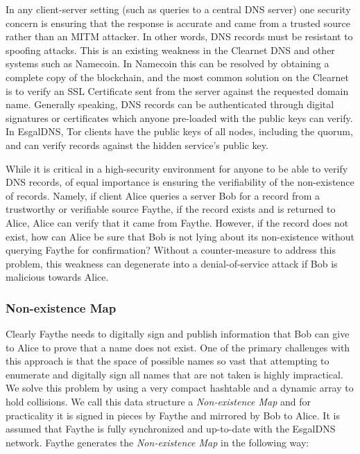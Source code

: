 In any client-server setting (such as queries to a central DNS server) one security concern is ensuring that the response is accurate and came from a trusted source rather than an MITM attacker. In other words, DNS records must be resistant to spoofing attacks. This is an existing weakness in the Clearnet DNS and other systems such as Namecoin. In Namecoin this can be resolved by obtaining a complete copy of the blockchain, and the most common solution on the Clearnet is to verify an SSL Certificate sent from the server against the requested domain name. Generally speaking, DNS records can be authenticated through digital signatures or certificates which anyone pre-loaded with the public keys can verify. In EsgalDNS, Tor clients have the public keys of all nodes, including the quorum, and can verify records against the hidden service's public key.

While it is critical in a high-security environment for anyone to be able to verify DNS records, of equal importance is ensuring the verifiability of the non-existence of records. Namely, if client Alice queries a server Bob for a record from a trustworthy or verifiable source Faythe, if the record exists and is returned to Alice, Alice can verify that it came from Faythe. However, if the record does not exist, how can Alice be sure that Bob is not lying about its non-existence without querying Faythe for confirmation? Without a counter-measure to address this problem, this weakness can degenerate into a denial-of-service attack if Bob is malicious towards Alice.

\subsubsection{Non-existence Map}

Clearly Faythe needs to digitally sign and publish information that Bob can give to Alice to prove that a name does not exist. One of the primary challenges with this approach is that the space of possible names so vast that attempting to enumerate and digitally sign all names that are not taken is highly impractical. We solve this problem by using a very compact hashtable and a dynamic array to hold collisions. We call this data structure a \emph{Non-existence Map} and for practicality it is signed in pieces by Faythe and mirrored by Bob to Alice. It is assumed that Faythe is fully synchronized and up-to-date with the EsgalDNS network. Faythe generates the \emph{Non-existence Map} in the following way:

